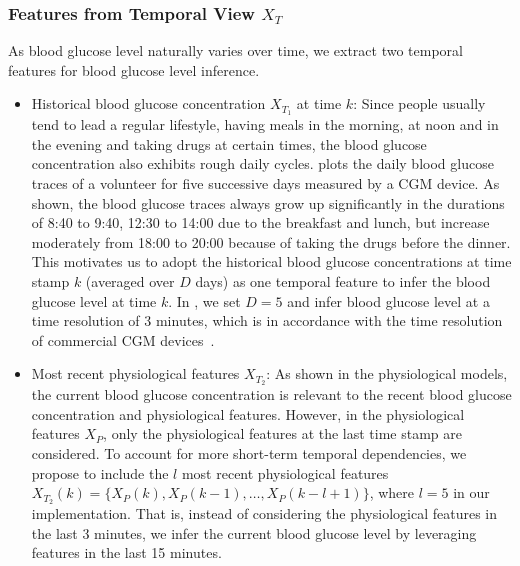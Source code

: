 %




\subsubsection{Features from Temporal View $X_T$}
As blood glucose level naturally varies over time, we extract two temporal features for blood glucose level inference.
\begin{itemize}
  \item
  Historical blood glucose concentration $X_{T_1}$ at time $k$:
  Since people usually tend to lead a regular lifestyle, \eg having meals in the morning, at noon and in the evening and taking drugs at certain times, the blood glucose concentration also exhibits rough daily cycles.
   plots the daily blood glucose traces of a volunteer for five successive days measured by a CGM device. As shown, the blood glucose traces always grow up significantly
  in the durations of 8:40 to 9:40, 12:30 to 14:00 due to the breakfast and lunch, but increase moderately from 18:00 to 20:00 because of taking the drugs before the dinner.
  This motivates us to adopt the historical blood glucose concentrations at time stamp $k$ (averaged over $D$ days) as one temporal feature to infer the blood glucose level at time $k$.
  In \sysname, we set $D=5$ and infer blood glucose level at a time resolution of 3 minutes, which is in accordance with the time resolution of commercial CGM devices~\cite{bib:CGM_wave}.
  \item
  Most recent physiological features $X_{T_2}$:
  As shown in the physiological models, the current blood glucose concentration is relevant to the recent blood glucose concentration and physiological features.
  However, in the physiological features $X_P$, only the physiological features at the last time stamp are considered.
  To account for more short-term temporal dependencies, we propose to include the $l$ most recent physiological features $X_{T_2}(k) = \{X_P(k), X_P(k-1), \ldots, X_P(k-l+1)\}$, where $l=5$ in our implementation.
  That is, instead of considering the physiological features in the last 3 minutes, we infer the current blood glucose level by leveraging features in the last 15 minutes.
\end{itemize}

